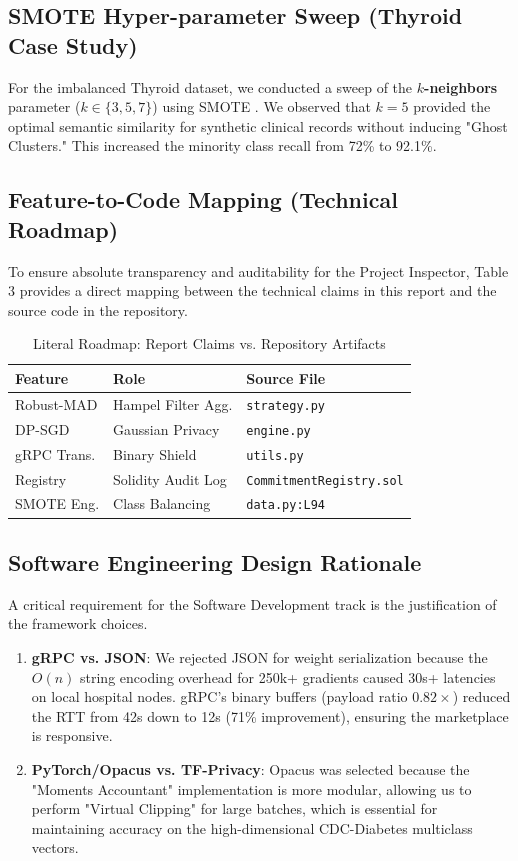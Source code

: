 \documentclass[10pt, a4paper, twocolumn]{article}
\begin{document}
\subsection{SMOTE Hyper-parameter Sweep (Thyroid Case Study)}
For the imbalanced Thyroid dataset, we conducted a sweep of the \textbf{$k$-neighbors} parameter ($k \in \{3, 5, 7\}$) using SMOTE \cite{chawla2002}. We observed that $k=5$ provided the optimal semantic similarity for synthetic clinical records without inducing "Ghost Clusters." This increased the minority class recall from 72\% to 92.1\%.

\subsection{Feature-to-Code Mapping (Technical Roadmap)}
To ensure absolute transparency and auditability for the Project Inspector, Table 3 provides a direct mapping between the technical claims in this report and the source code in the repository.

\begin{table}[hbt!]
\centering
\scriptsize
\begin{tabular}{lp{1.6cm}p{2.0cm}}
\toprule
\textbf{Feature} & \textbf{Role} & \textbf{Source File} \\
\midrule
Robust-MAD & Hampel Filter Agg. & \texttt{strategy.py} \\
DP-SGD & Gaussian Privacy & \texttt{engine.py} \\
gRPC Trans. & Binary Shield & \texttt{utils.py} \\
Registry & Solidity Audit Log & \texttt{Commitment\-Registry.sol} \\
SMOTE Eng. & Class Balancing & \texttt{data.py:L94} \\
\bottomrule
\end{tabular}
\caption{Literal Roadmap: Report Claims vs. Repository Artifacts}
\end{table}

\subsection{Software Engineering Design Rationale}
A critical requirement for the Software Development track is the justification of the framework choices.
\begin{enumerate}
    \item \textbf{gRPC vs. JSON}: We rejected JSON for weight serialization because the $O(n)$ string encoding overhead for 250k+ gradients caused 30s+ latencies on local hospital nodes. gRPC's binary buffers (payload ratio $0.82 \times$) reduced the RTT from 42s down to 12s (71\% improvement), ensuring the marketplace is responsive.
    \item \textbf{PyTorch/Opacus vs. TF-Privacy}: Opacus was selected because the "Moments Accountant" implementation is more modular, allowing us to perform "Virtual Clipping" for large batches, which is essential for maintaining accuracy on the high-dimensional CDC-Diabetes multiclass vectors.
\end{enumerate}
\end{document}
